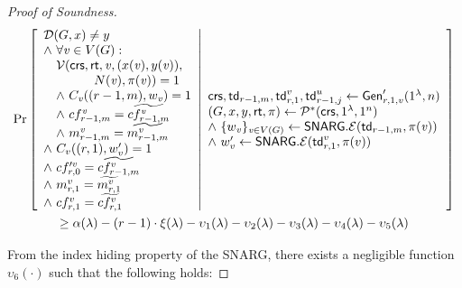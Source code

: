 \begin{proof}[Proof of Soundness]
\begin{gather*}
    \Pr \left[ \begin{array}{ll} 
    \mathcal{D}(G, x)\neq y  \\
    \wedge\ \forall \mathit{ v }\in V(G) : \\
    \quad \mathcal{V}(\mathsf{crs}, \mathsf{rt}, \mathit{ v }, (x(\mathit{ v }), y(\mathit{ v })),\\
    \qquad \qquad N(\mathit{ v }), \pi(\mathit{ v })) = 1 \\
    \quad \wedge ~C_{\mathit{ v }}((r-1, m), w_{\mathit{ v }}) = 1 \\
    \quad \wedge ~cf^{\mathit{ v }}_{r-1, m} = \widetilde{cf^{\mathit{ v }}_{r-1,m}} \\
    \quad \wedge ~m^{\mathit{ v }}_{r-1,m} = \widetilde{m^{\mathit{ v }}_{r-1,m}} \\
    \wedge ~C_v((r,1),w'_v) = 1 \\
    \wedge ~cf'^v_{r,0} = \widetilde{cf^v_{r-1,m}} \\
    \wedge ~m^v_{r,1} = \widetilde{m^v_{r,1}} \\
    \wedge ~cf^v_{r, 1} = \widetilde{cf^v_{r,1}}
     \end{array} \middle\vert \begin{array}{ll} 
    \mathsf{crs}, \mathsf{td}_{r-1,m}, \mathsf{td}^v_{r,1}, \mathsf{td}^{u}_{r-1, j}\leftarrow \mathsf{Gen}'_{r,1,v}(1^\lambda, n) \\
    (G, x, y, \mathsf{rt}, \pi) \leftarrow \mathcal{P}^*(\mathsf{crs}, 1^\lambda, 1^n)\\
    \wedge ~\{w_{\mathit{ v }}\}_{\mathit{ v }\in V(G)}\leftarrow \mathsf{SNARG}.\mathcal{E}(\mathsf{td}_{r-1,m}, \pi(\mathit{ v })) \\
    \wedge ~w'_v\leftarrow \mathsf{SNARG}.\mathcal{E}(\mathsf{td}^v_{r,1}, \pi(v)) \\
     \end{array} \right]\\
    \geq \alpha(\lambda) - (r-1)\cdot\xi(\lambda) - \upsilon_1(\lambda) - \upsilon_2(\lambda) - \upsilon_3(\lambda) - \upsilon_4(\lambda) - \upsilon_5(\lambda)
\end{gather*}

From the index hiding property of the SNARG, there exists a negligible function $\upsilon_6(\cdot)$ such that the following holds:


\end{proof}
